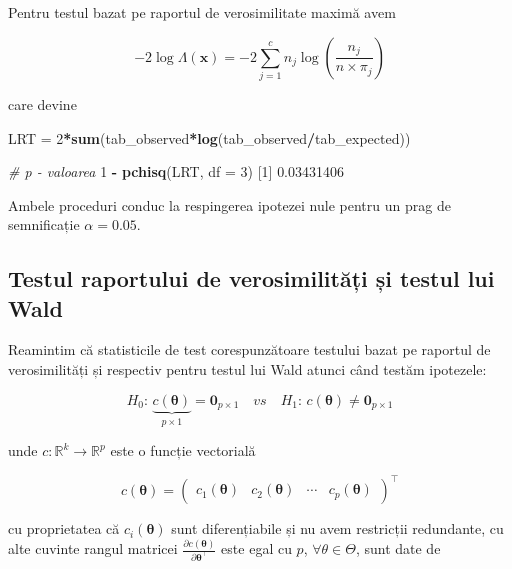 \documentclass[]{article}
\newenvironment{Shaded}{\begin{snugshade}}{\end{snugshade}}
\newcommand{\KeywordTok}[1]{\textcolor[rgb]{0.13,0.29,0.53}{\textbf{#1}}}
\newcommand{\DataTypeTok}[1]{\textcolor[rgb]{0.13,0.29,0.53}{#1}}
\newcommand{\DecValTok}[1]{\textcolor[rgb]{0.00,0.00,0.81}{#1}}
\newcommand{\FloatTok}[1]{\textcolor[rgb]{0.00,0.00,0.81}{#1}}
\newcommand{\StringTok}[1]{\textcolor[rgb]{0.31,0.60,0.02}{#1}}
\newcommand{\CommentTok}[1]{\textcolor[rgb]{0.56,0.35,0.01}{\textit{#1}}}
\newcommand{\OperatorTok}[1]{\textcolor[rgb]{0.81,0.36,0.00}{\textbf{#1}}}
\newcommand{\NormalTok}[1]{#1}
\begin{document}
Pentru testul bazat pe raportul de verosimilitate maximă avem

\[
  -2\log \Lambda(\mathbf{x}) = -2\sum_{j = 1}^{c} n_{j}\log\left(\frac{n_{j}}{n\times \pi_{j}}\right)
\]

care devine

\begin{Shaded}
\begin{Highlighting}[]
\NormalTok{LRT =}\StringTok{ }\DecValTok{2}\OperatorTok{*}\KeywordTok{sum}\NormalTok{(tab_observed}\OperatorTok{*}\KeywordTok{log}\NormalTok{(tab_observed}\OperatorTok{/}\NormalTok{tab_expected))}

\CommentTok{# p - valoarea}
\DecValTok{1} \OperatorTok{-}\StringTok{ }\KeywordTok{pchisq}\NormalTok{(LRT, }\DataTypeTok{df =} \DecValTok{3}\NormalTok{)}
\NormalTok{[}\DecValTok{1}\NormalTok{] }\FloatTok{0.03431406}
\end{Highlighting}
\end{Shaded}

Ambele proceduri conduc la respingerea ipotezei nule pentru un prag de
semnificație \(\alpha = 0.05\).

\subsection{Testul raportului de verosimilități și testul lui
Wald}\label{testul-raportului-de-verosimilitati-si-testul-lui-wald}

Reamintim că statisticile de test corespunzătoare testului bazat pe
raportul de verosimilități și respectiv pentru testul lui Wald atunci
când testăm ipotezele:

\[
H_0:\, \underbrace{c(\boldsymbol{\theta})}_{p\times 1} = \boldsymbol{0}_{p\times 1} \quad vs\quad H_1:\, c(\boldsymbol{\theta})\neq \boldsymbol{0}_{p\times 1}
\]

unde \(c:\mathbb{R}^k\to\mathbb{R}^p\) este o funcție vectorială

\[
c(\boldsymbol{\theta}) = \begin{pmatrix}c_1(\boldsymbol{\theta}) & c_2(\boldsymbol{\theta}) &\cdots & c_p(\boldsymbol{\theta})\end{pmatrix}^\intercal
\]

cu proprietatea că \(c_i(\boldsymbol{\theta})\) sunt diferențiabile și
nu avem restricții redundante, cu alte cuvinte rangul matricei
\(\frac{\partial c(\boldsymbol{\theta})}{\partial \boldsymbol{\theta}^\intercal}\)
este egal cu \(p\), \(\forall\theta\in\Theta\), sunt date de
\end{document}
